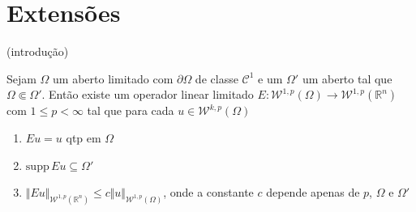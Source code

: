 \documentclass[a4paper, 11pt]{book}
\theoremstyle{definition}
\newcommand{\bR}{\mathbb{R}}
\newcommand{\cC}{\mathcal{C}}
\newcommand{\cW}{\mathcal{W}}
\newcommand{\supp}{\mathrm{supp}\,}
\begin{document}
\section{Extensões}

(introdução)

\begin{tbox} \label{thm:extensao}
    Sejam $\Omega$ um aberto limitado com $\partial\Omega$ de classe $\cC^1$ e um $\Omega'$ um aberto tal que $\Omega \Subset \Omega'$. Então existe um operador linear limitado $E : \cW^{1,p}(\Omega) \to \cW^{1,p}(\bR ^n)$ com $1 \leqslant p < \infty$ tal que para cada $u \in \cW^{k,p}(\Omega)$
    \begin{enumerate}[leftmargin=*, label=\textbf{(\alph*)}]
        \item $Eu = u$ qtp em $\Omega$
        \item $\supp Eu \subseteq \Omega'$
        \item $\Vert Eu \Vert_{\cW^{1,p}(\bR^n)} \leqslant c \Vert u \Vert_{\cW^{1,p}(\Omega)}$, onde a constante $c$ depende apenas de $p$, $\Omega$ e $\Omega'$
    \end{enumerate}
\end{tbox}
\end{document}
